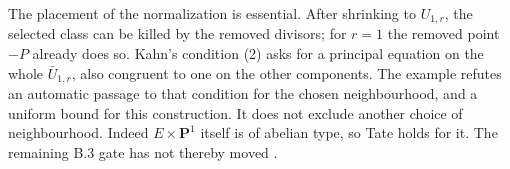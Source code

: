 The placement of the normalization is essential.  After shrinking
to \(U_{1,r}\), the selected class can be killed by the removed
divisors; for \(r=1\) the removed point \(-P\) already does so.
Kahn's condition (2) asks for a principal equation on the whole
\(\bar U_{1,r}\), also congruent to one on the other components.
The example refutes an automatic passage to that condition for the
chosen neighbourhood, and a uniform bound for this construction.
It does not exclude another choice of neighbourhood.  Indeed
\(E\times\mathbf P^1\) itself is of abelian type, so Tate holds
for it.  The remaining B.3 gate has not thereby moved
\cite[Corollary~3.3 and \S\S3.2.2--3.2.4]{BKahn2025}.
